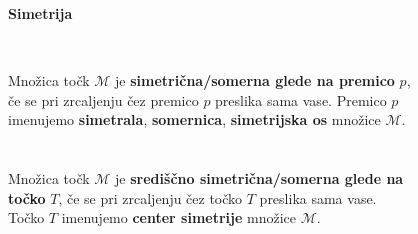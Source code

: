         \begin{frame}
            \large\textbf{Simetrija}
            ~\\
            \normalsize
            \begin{columns}
                ~\\
                Množica točk $\mathcal{M}$ je \textbf{simetrična/somerna glede na premico} $p$, če se pri zrcaljenju čez premico $p$ preslika sama vase. Premico $p$ imenujemo \textbf{simetrala}, \textbf{somernica}, \textbf{simetrijska os} množice $\mathcal{M}$. \\
                 ~\\      
                 ~\\      
                Množica točk $\mathcal{M}$ je \textbf{središčno simetrična/somerna glede na točko} $T$, če se pri zrcaljenju čez točko $T$ preslika sama vase. Točko $T$ imenujemo \textbf{center simetrije} množice $\mathcal{M}$. 
                \begin{figure}

                \end{figure}
            \end{columns}


        \end{frame}

